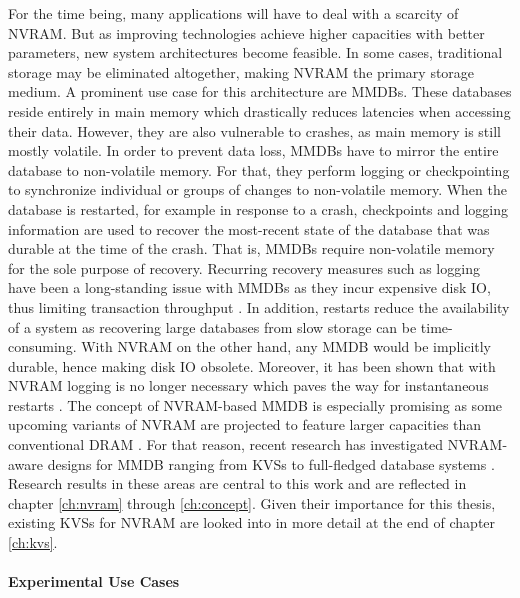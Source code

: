 For the time being, many applications will have to deal with a scarcity of
\ac{NVRAM}. But as improving technologies achieve higher capacities with better
parameters, new system architectures become feasible. In some cases, traditional
storage may be eliminated altogether, making \ac{NVRAM} the primary storage
medium. A prominent use case for this architecture are \acp{MMDB}. These
databases reside entirely in main memory which drastically reduces latencies
when accessing their data. However, they are also vulnerable to crashes, as main
memory is still mostly volatile. In order to prevent data loss, \acp{MMDB} have
to mirror the entire database to non-volatile memory. For that, they perform
logging or checkpointing to synchronize individual or groups of changes to
non-volatile memory. When the database is restarted, for example in response to
a crash, checkpoints and logging information are used to recover the most-recent
state of the database that was durable at the time of the crash. That is,
\acp{MMDB} require non-volatile memory for the sole purpose of recovery.
Recurring recovery measures such as logging have been a long-standing issue with
\acp{MMDB} as they incur expensive disk \ac{IO}, thus limiting transaction
throughput \cite{molina1992main, wust2012efficient,
malviya2014rethinking}. In addition, restarts reduce the availability of a
system as recovering large databases from slow storage can be time-consuming.
With \ac{NVRAM} on the other hand, any \ac{MMDB} would be implicitly durable,
hence making disk \ac{IO} obsolete. Moreover, it has been shown that with
\ac{NVRAM} logging is no longer necessary which paves the way for instantaneous
restarts \cite{oukid2015instant}. The concept of \ac{NVRAM}-based \ac{MMDB} is
especially promising as some upcoming variants of \ac{NVRAM} are projected to
feature larger capacities than conventional \ac{DRAM} \cite{lee2009architecting,
zilberberg2013phase, dulloor2014system}. For that reason, recent research has
investigated \ac{NVRAM}-aware designs for \ac{MMDB} ranging from \acp{KVS}
\cite{bailey2013exploring, zhou2016nvht, wu2016nvmcached} to full-fledged
database systems \cite{oukid2015instant, schwalb2016hyrise, andrei2017sap}.
Research results in these areas are central to this work and are reflected in
chapter \ref{ch:nvram} through \ref{ch:concept}. Given their importance for this
thesis, existing \acp{KVS} for \ac{NVRAM} are looked into in more detail at the
end of chapter \ref{ch:kvs}.

\paragraph{Experimental Use Cases}

